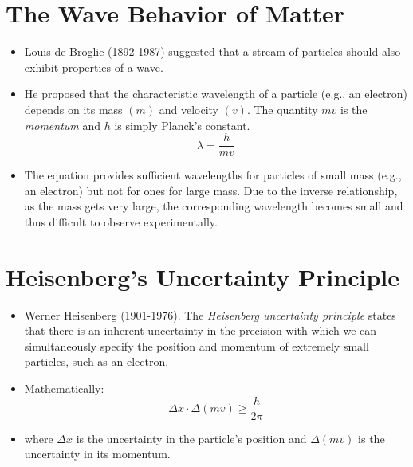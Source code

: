 \documentclass[
	chapter=7,
	title={Quantum Theory {\&} the Electronic Structure of Atoms},
	showanswers=true,
]{chem122notes}
\begin{document}
\section{The Wave Behavior of Matter}\label{sec:the-wave-behavior-of-matter}
\begin{itemize}
	\item Louis de Broglie (1892-1987) suggested that a stream of particles should also exhibit properties of a wave.
	\item He proposed that the characteristic wavelength of a particle (e.g., an electron) depends on its mass $(m)$ and velocity $(v)$.
	The quantity $mv$ is the \emph{momentum} and $h$ is simply Planck's constant.
	\begin{equation}
		\lambda = \frac{h}{mv}
		\label{eq:wave-behavior-of-matter}
	\end{equation}
	\item The equation provides sufficient wavelengths for particles of small mass (e.g., an electron) but not for ones for large mass.
	Due to the inverse relationship, as the mass gets very large, the corresponding wavelength becomes small and thus difficult to observe experimentally.
\end{itemize}

\section{Heisenberg's Uncertainty Principle}\label{sec:heisenberg's-uncertainty-principle}
\begin{itemize}
	\item Werner Heisenberg (1901-1976).
	The \emph{Heisenberg uncertainty principle} states that there is an inherent uncertainty in the precision with which we can simultaneously specify the position and momentum of extremely small particles, such as an electron.
	\item Mathematically:
	\begin{equation}
		\Delta x \cdot \Delta (mv) \geq \frac{h}{2\pi}
		\label{eq:heisenberg-uncertainty-principle}
	\end{equation}
	\item where $\Delta x$ is the uncertainty in the particle's position and $\Delta (mv)$ is the uncertainty in its momentum.
\end{itemize}
\end{document}
